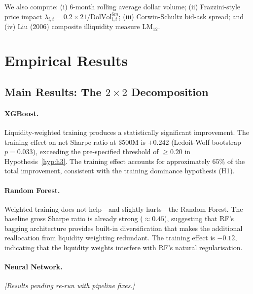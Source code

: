 \documentclass[a4paper,12pt,final]{article}
\begin{document}
We also compute: (i) 6-month rolling average dollar volume; (ii) Frazzini-style price impact $\lambda_{i,t} = 0.2 \times 21 / \text{DolVol}_{i,t}^{6m}$; (iii) Corwin-Schultz bid-ask spread; and (iv) Liu (2006) composite illiquidity measure LM$_{12}$.


\section{Empirical Results}
\label{sec:results}

\subsection{Main Results: The $2 \times 2$ Decomposition}
\label{subsec:main_results}

% 


\paragraph{XGBoost.} Liquidity-weighted training produces a statistically significant improvement. The training effect on net Sharpe ratio at \$500M is $+0.242$ (Ledoit-Wolf bootstrap $p=0.033$), exceeding the pre-specified threshold of $\geq 0.20$ in Hypothesis~\ref{hyp:h3}. The training effect accounts for approximately 65\% of the total improvement, consistent with the training dominance hypothesis (H1).

\paragraph{Random Forest.} Weighted training does not help---and slightly hurts---the Random Forest. The baseline gross Sharpe ratio is already strong ($\approx 0.45$), suggesting that RF's bagging architecture provides built-in diversification that makes the additional reallocation from liquidity weighting redundant. The training effect is $-0.12$, indicating that the liquidity weights interfere with RF's natural regularisation.

\paragraph{Neural Network.} \emph{[Results pending re-run with pipeline fixes.]}
\end{document}
